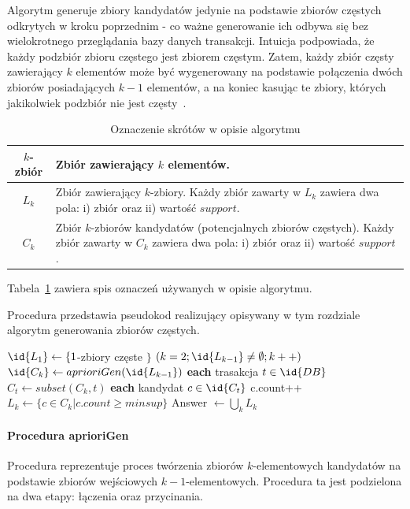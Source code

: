 Algorytm generuje zbiory kandydatów jedynie na podstawie zbiorów częstych odkrytych w kroku poprzednim - co ważne generowanie ich odbywa się bez wielokrotnego przeglądania bazy danych transakcji. Intuicja podpowiada, że każdy podzbiór zbioru częstego jest zbiorem częstym. Zatem, każdy zbiór częsty zawierający $k$ elementów może być wygenerowany na podstawie połączenia dwóch zbiorów posiadających $k-1$ elementów, a na koniec kasując te zbiory, których jakikolwiek podzbiór nie jest częsty~\cite{Apriori:Main}.

\begin{table}
	\centering
	\begin{tabular}{|c|p{7.7cm}|} \hline
	$k$-zbiór & Zbiór zawierający $k$ elementów. \\ \hline
	$L_k$ & Zbiór zawierający $k$-zbiory. Każdy zbiór zawarty w $L_k$ zawiera dwa pola: i) zbiór oraz ii) wartość $support$. \\ \hline
	$C_k$ & Zbiór $k$-zbiorów kandydatów (potencjalnych zbiorów częstych). Każdy zbiór zawarty w $C_k$ zawiera dwa pola: i) zbiór oraz ii) wartość $support$. \\ \hline
	\end{tabular}\label{skroty:znaczanie}
	\caption{Oznaczenie skrótów w opisie algorytmu}
\end{table}

Tabela~\ref{skroty:znaczanie} zawiera spis oznaczeń używanych w opisie algorytmu. 

Procedura  przedstawia pseudokod realizujący opisywany w tym rozdziale algorytm generowania zbiorów częstych.

\begin{codebox}
	\label{apriori:listing}
	\li $\id{L_1} \gets \lbrace 1$-zbiory częste $\rbrace$
		\li \For $(k = 2; \id{L_{k-1}} \neq \emptyset; k++)$
		\li \Do
			 $\id{C_k} \gets aprioriGen(\id{L_{k-1}})$
			\li \For \textbf{each} trasakcja $t \in \id{DB}$
			\li \Do
					$C_t \gets subset(C_k, t)$
					\li \For \textbf{each} kandydat $c \in \id{C_t}$
					\li \Do c.count++
					\End
				\End
			\li $L_k \gets \lbrace c \in C_k | c.count \geq minsup \rbrace$	
		\End
	\li Answer $\gets \bigcup_k L_k $
\end{codebox}

\paragraph{Procedura aprioriGen}
Procedura  reprezentuje proces twórzenia zbiorów $k$-elementowych kandydatów na podstawie zbiorów wejściowych ${k-1}$-elementowych. Procedura ta jest podzielona na dwa etapy: łączenia oraz przycinania. 

